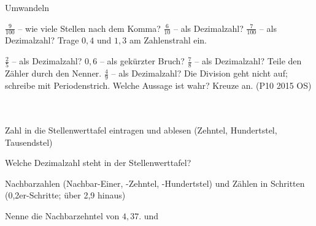\setcounter{aufgabe}{20}

\begin{aufgabe}{Umwandeln}
\begin{teile}
\teil $\frac{9}{100}$ – wie viele Stellen nach dem Komma? \leerfeld
\teil $\frac{6}{10}$ – als Dezimalzahl? \leerfeld
\teil $\frac{7}{100}$ – als Dezimalzahl? \leerfeld
\teil Trage $0{,}4$ und $1{,}3$ am Zahlenstrahl ein.

\teil $\frac{2}{5}$ – als Dezimalzahl? \leerfeld
\teil $0{,}6$ – als gekürzter Bruch? \leerfeld
\teil $\frac{7}{8}$ – als Dezimalzahl? Teile den Zähler durch den Nenner. \leerfeld
\teil $\frac{4}{9}$ – als Dezimalzahl? Die Division geht nicht auf; schreibe mit Periodenstrich. \leerfeld
\teil Welche Aussage ist wahr? Kreuze an. \hfill (P10 2015 OS)\\ \\ \\ 
\end{teile}
\end{aufgabe}

\begin{aufgabe}{Zahl in die Stellenwerttafel eintragen und ablesen (Zehntel, Hundertstel, Tausendstel)}
\begin{teile}
\teil Welche Dezimalzahl steht in der Stellenwerttafel?

\leerfeld
\end{teile}
\end{aufgabe}

\begin{aufgabe}{Nachbarzahlen (Nachbar-Einer, -Zehntel, -Hundertstel) und Zählen in Schritten (0,2er-Schritte; über 2,9 hinaus)}
\begin{teile}
\teil Nenne die Nachbarzehntel von $4{,}37$. \leerfeld und \leerfeld
\end{teile}
\end{aufgabe}

